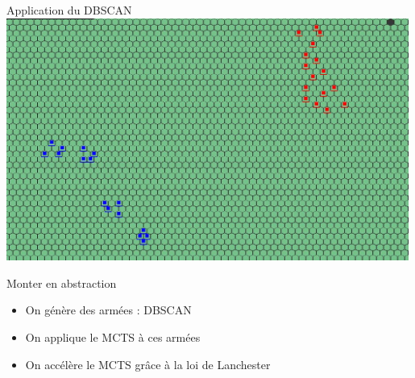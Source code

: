 \documentclass[french]{beamer}
\begin{document}
\begin{frame}{Application du DBSCAN}
	\centering
	\includegraphics[width=0.99\textwidth]{groupes screen.jpg}
\end{frame}
\begin{frame}{Monter en abstraction}
\begin{itemize}
	\item On génère des armées : DBSCAN
	\item On applique le MCTS à ces armées
	\item On accélère le MCTS grâce à la loi de Lanchester
\end{itemize}
\end{frame}
\end{document}
